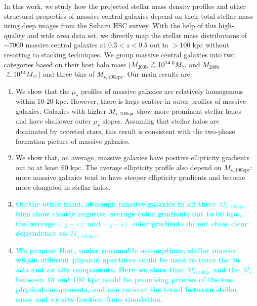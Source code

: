 \documentclass[a4paper,fleqn,usenatbib]{mnras}
\def\simlt{\lower.5ex\hbox{$\; \buildrel < \over {\sim} \;$}}
\def\simgt{\lower.5ex\hbox{$\; \buildrel > \over {\sim} \;$}}
\def\mstar{{$M_{\star}$}}
\def\mhalo{{$M_{\mathrm{200b}}$}}
\def\minn{{$M_{\star,10\mathrm{kpc}}$}}
\def\mtot{{$M_{\star,100\mathrm{kpc}}$}}
\def\mden{{$\mu_{\star}$}}
\newcommand{\song}[1]{\textcolor{cyan}{\textbf{#1}}}
\begin{document}
    In this work, we study how the projected stellar mass density profiles and other 
    structural properties of massive central galaxies depend on their total stellar 
    mass using deep images from the Subaru HSC survey. 
    With the help of this high-quality and wide area data set, we directly map the 
    stellar mass distributions of ${\sim}7000$ massive central galaxies at 
    $0.3 < z < 0.5$ out to $>100$ kpc without resorting to stacking techniques. 
    We group massive central galaxies into two categories based on their host halo 
    mass (\mhalo{}$\simgt 10^{14.0} M_{\odot}$ and \mhalo{}$\simlt 10^{14} M_{\odot}$)
    and three bins of \mtot{}.  
    Our main results are:  
    
    \begin{enumerate}  
        
        \item We show that the \mden{} profiles of massive galaxies are relatively
            homogenous within 10-20 kpc. 
            However, there is large scatter in outer profiles of massive galaxies. 
            Galaxies with higher \mtot{} show more prominent stellar halos and have 
            shallower outer \mden{} slopes. 
            Assuming that stellar halos are dominated by accreted stars, this result 
            is consistent with the two-phase formation picture of massive galaxies.
             
        \item We show that, on average, massive galaxies have positive ellipticity 
            gradients out to at least 60 kpc. 
            The average ellipticity profile also depend on \mtot{}: more massive 
            galaxies tend to have steeper ellipticity gradients and become more 
            elongated in stellar halos. 
        
        \item \song{
            On the other hand, although massive galaxies in all three \mtot{} bins 
            show clearly negative average color gradients out to 60 kpc, the 
            average $(g-r)$ and $(g-i)$ color gradients do not show clear dependence 
            on \mtot{}. 
            }
            
        \item \song{
            We propose that, under reasonable assumptions, stellar masses within 
            different physical apertures could be used to trace the 
            \textit{in situ} and \textit{ex situ} components. 
            Here we show that \minn{} and the \mstar{} between 10 and 100 kpc could 
            be promising proxies of the two physical components, and can recover the 
            trend between stellar mass and \textit{ex situ} fraction from simulation.
            }
         

\end{enumerate}
\end{document}
